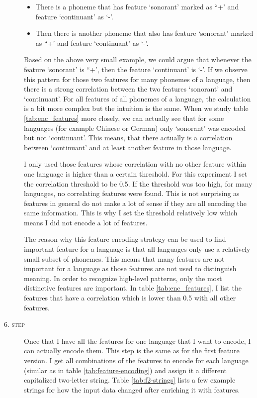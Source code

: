 \begin{description}
    \begin{itemize}
        \item There is a phoneme  that has feature `sonorant' marked as ``+' and feature `continuant' as `-'.
        \item Then there is another phoneme  that also has feature `sonorant' marked as ``+' and feature `continuant' as `-'.
    \end{itemize}
    Based on the above very small example, we could argue that whenever the feature `sonorant' is ``+', then the feature `continuant' is `-'. If we observe this pattern for those two features for many phonemes of a language, then there is a strong correlation between the two features `sonorant' and `continuant'. For all features of all phonemes of a language, the calculation is a bit more complex but the intuition is the same. When we study table \ref{tab:enc_features} more closely, we can actually see that for some languages (for example Chinese or German) only `sonorant' was encoded but not `continuant'. This means, that there actually is a correlation between `continuant' and at least another feature in those language. 
    
    I only used those features whose correlation with no other feature within one language is higher than a certain threshold. For this experiment I set the correlation threshold to be 0.5. If the threshold was too high, for many languages, no correlating features were found. This is not surprising as features in general do not make a lot of sense if they are all encoding the same information. This is why I set the threshold relatively low which means I did not encode a lot of features. 
    
    The reason why this feature encoding strategy can be used to find important feature for a language is that all languages only use a relatively small subset of phonemes. This means that many features are not important for a language as those features are not used to distinguish meaning. In order to recognize high-level patterns, only the most distinctive features are important. In table \ref{tab:enc_features}, I list the features that have a correlation which is lower than 0.5 with all other features.
    
    \item[\textsc{6. step}] Once that I have all the features for one language that I want to encode, I can actually encode them. This step is the same as for the first feature version. I get all combinations of the features to encode for each language (similar as in table \ref{tab:feature-encoding}) and assign it a different capitalized two-letter string. Table \ref{tab:f2-strings} lists a few example strings for how the input data changed after enriching it with features.  
\end{description}

